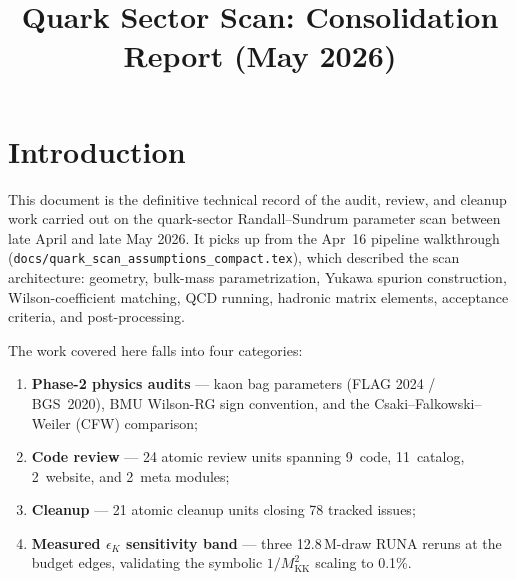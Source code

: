 \documentclass[11pt]{article}
\title{Quark Sector Scan: Consolidation Report (May 2026)}
\author{}
\date{}
\newcommand{\Mkk}{M_{\mathrm{KK}}}
\newcommand{\eK}{\epsilon_K}
\begin{document}
\maketitle

\begin{center}
\end{center}

\section{Introduction}
\label{sec:intro}

This document is the definitive technical record of the audit,
review, and cleanup work carried out on the quark-sector
Randall--Sundrum parameter scan between late April and late May 2026.
It picks up from the Apr~16 pipeline walkthrough
(\texttt{docs/quark\_scan\_assumptions\_compact.tex}), which described
the scan architecture: geometry, bulk-mass parametrization, Yukawa
spurion construction, Wilson-coefficient matching, QCD running, hadronic
matrix elements, acceptance criteria, and post-processing.

The work covered here falls into four categories:
\begin{enumerate}[label=(\roman*)]
  \item \textbf{Phase-2 physics audits} --- kaon bag parameters (FLAG
    2024 / BGS~2020), BMU Wilson-RG sign convention, and the
    Csaki--Falkowski--Weiler (CFW) comparison;
  \item \textbf{Code review} --- 24 atomic review units spanning
    9~code, 11~catalog, 2~website, and 2~meta modules;
  \item \textbf{Cleanup} --- 21 atomic cleanup units closing 78 tracked
    issues;
  \item \textbf{Measured $\eK$ sensitivity band} --- three
    12.8\,M-draw RUNA reruns at the budget edges, validating the
    symbolic $1/\Mkk^2$ scaling to 0.1\%.
\end{enumerate}
\end{document}
